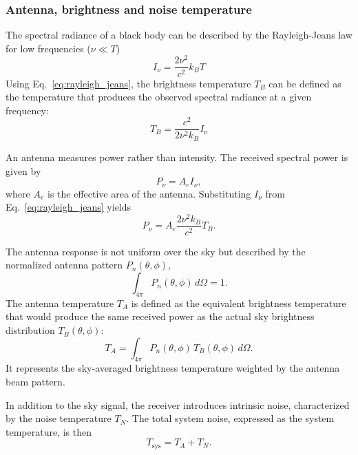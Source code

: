 \subsubsection{Antenna, brightness and noise temperature}

The spectral radiance of a black body can be described by the Rayleigh-Jeans law for low frequencies ($\nu \ll T$) \cite[Eq. (3)]{srt}
\begin{equation}
    I_\nu = \frac{2\nu^2}{c^2}k_{B}T \label{eq:rayleigh_jeans}
\end{equation}
Using Eq.~\eqref{eq:rayleigh_jeans}, the brightness temperature $T_B$ can be defined as the temperature that produces the observed spectral radiance at a given frequency:
\begin{equation}
    T_B = \frac{c^2}{2\nu^2k_{B}} I_\nu
\end{equation}

An antenna measures power rather than intensity. The received spectral power is given by
\begin{equation}
    P_\nu = A_e I_\nu,
\end{equation}
where $A_e$ is the effective area of the antenna. Substituting $I_\nu$ from Eq.~\eqref{eq:rayleigh_jeans} yields
\begin{equation}
    P_\nu = A_e \frac{2\nu^2 k_B}{c^2} T_B.
\end{equation}

The antenna response is not uniform over the sky but described by the normalized antenna pattern $P_n(\theta, \phi)$,
\begin{equation}
    \int_{4\pi} P_n(\theta, \phi) \, d\Omega = 1.
\end{equation}
The antenna temperature $T_A$ is defined as the equivalent brightness temperature that would produce the same received power as the actual sky brightness distribution $T_B(\theta, \phi)$:
\begin{equation}
    T_A = \int_{4\pi} P_n(\theta, \phi) \, T_B(\theta, \phi) \, d\Omega.
\end{equation}
It represents the sky-averaged brightness temperature weighted by the antenna beam pattern.

In addition to the sky signal, the receiver introduces intrinsic noise, characterized by the noise temperature $T_N$. The total system noise, expressed as the system temperature, is then
\begin{equation}
    T_\text{sys} = T_A + T_N.
\end{equation}

